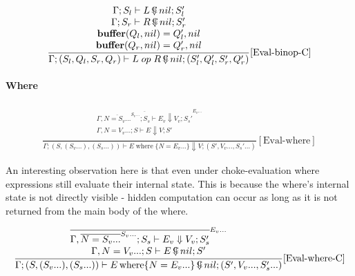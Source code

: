 \documentclass{scrartcl}
\DeclareMathOperator{\where}{where}
\DeclareMathOperator{\ceval}{\overset{C}{\smash{\Downarrow}}}
\DeclareMathOperator{\buffer}{\mathbf{buffer}}
\begin{document}
    \begin{align*}
    \frac{
        \begin{matrix}
        \Gamma; S_l \vdash L \ceval nil; S_l' \\
        \Gamma; S_r \vdash R \ceval nil; S_r' \\
        \buffer(Q_l, nil) = Q_l', nil \\
        \buffer(Q_r, nil) = Q_r', nil
        \end{matrix}
    }{
        \Gamma; (S_l, Q_l, S_r, Q_r) \vdash L \; op \; R \ceval nil; (S_l', Q_l', S_r', Q_r')
    }[\text{Eval-binop-C}]
    \end{align*}
    
    \paragraph{Where}
    
    \begin{align*}
    \frac{
        \begin{matrix}
        \overline{\Gamma, \overline{N=S_v...}^{S_v...}; S_s \vdash E_v \Downarrow V_v; S_s'}^{E_v...} \\
        \Gamma, N=V_v...; S \vdash E \Downarrow V; S' \\
        \end{matrix}
    }{
        \Gamma; (S, (S_v...), (S_s...)) \vdash E \where \{ N=E_v... \} \Downarrow V; (S', V_v..., S_s'...)
    }[\text{Eval-where}]
    \end{align*}
    
    An interesting observation here is that even under choke-evaluation where expressions still evaluate their internal state. This is because the where's internal state is not directly visible - hidden computation can occur as long as it is not returned from the main body of the where.
    
    \begin{align*}
    \frac{
        \begin{matrix}
        \overline{\Gamma, \overline{N=S_v...}^{S_v...}; S_s \vdash E_v \Downarrow V_v; S_s'}^{E_v...} \\
        \Gamma, N=V_v...; S \vdash E \ceval nil; S' \\
        \end{matrix}
    }{
        \Gamma; (S, (S_v...), (S_s...)) \vdash E \where \{ N=E_v... \} \ceval nil; (S', V_v..., S_s'...)
    }[\text{Eval-where-C}]
    \end{align*}
    
\end{document}
